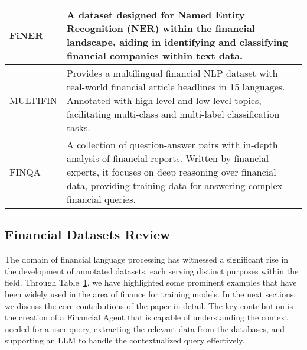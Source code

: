 \begin{table}[!h]
\begin{tabular}{|p{}|p{}|p{}|}
        FiNER & A dataset designed for Named Entity Recognition (NER) within the financial landscape, aiding in identifying and classifying financial companies within text data. & \cite{shah2023finer} \\ \hline
        MULTIFIN & Provides a multilingual financial NLP dataset with real-world financial article headlines in 15 languages. Annotated with high-level and low-level topics, facilitating multi-class and multi-label classification tasks. & \cite{jorgensen2023multifin} \\ \hline
        FINQA & A collection of question-answer pairs with in-depth analysis of financial reports. Written by financial experts, it focuses on deep reasoning over financial data, providing training data for answering complex financial queries. & \cite{chen2021finqa} \\ \hline
    \end{tabular}
    \vspace{-5mm}
    \label{tab:financial-datasets}
\end{table}

\subsection{Financial Datasets Review}   
The domain of financial language processing has witnessed a significant rise in the development of annotated datasets, each serving distinct purposes within the field. Through Table~\ref{tab:financial-datasets}, we have highlighted some prominent examples that have been widely used in the area of finance for training models. In the next sections, we discuss the core contributions of the paper in detail. The key contribution is the creation of a Financial Agent that is capable of understanding the context needed for a user query, extracting the relevant data from the databases, and supporting an LLM to handle the contextualized query effectively.

